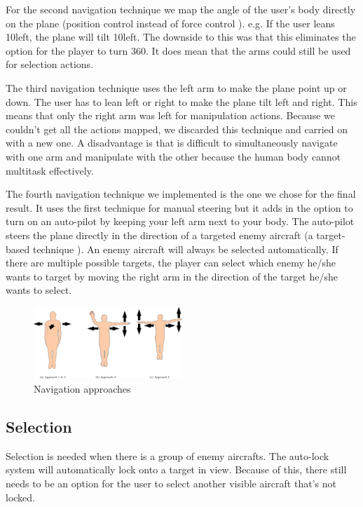 \documentclass{acm_proc_article-sp}
\begin{document}
For the second navigation technique we map the angle of the user's body directly on the plane (position control instead of force control \cite{bookpositionforcecontrol}).
e.g. If the user leans 10\degree left, the plane will tilt 10\degree left. The downside to this was that this eliminates the option for the player to turn 360\degree. It does mean that the arms could still be used for selection actions.

The third navigation technique uses the left arm to make the plane point up or down. The user has to lean left or right to make the plane tilt left and right. This means that only the right arm was left for manipulation actions.
Because we couldn't get all the actions mapped, we discarded this technique and carried on with a new one.
A disadvantage is that is difficult to simultaneously navigate with one arm and manipulate with the other because the human body cannot multitask effectively.
   
The fourth navigation technique we implemented is the one we chose for the final result. It uses the first technique for manual steering but it adds in the option to turn on an auto-pilot by keeping your left arm next to your body. The auto-pilot steers the plane directly in the direction of a targeted enemy aircraft (a target-based technique \cite{booktargetbased}). An enemy aircraft will always be selected automatically. If there are multiple possible targets, the player can select which enemy he/she wants to target by moving the right arm in the direction of the target he/she wants to select.


\begin{figure}[ht]
\centering
\includegraphics[width=0.5\textwidth ,keepaspectratio=true]{./img/approaches.jpg}
 \caption{Navigation approaches}
 \label{naviagationapproaches}
\end{figure}

\subsection{Selection}
Selection is needed when there is a group of enemy aircrafts. The auto-lock system will automatically lock onto a target in view. Because of this, there still needs to be an option for the user to select another visible aircraft that's not locked.
\end{document}
